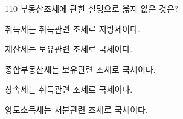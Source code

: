 \begin{question}{110}
부동산조세에 관한 설명으로 옳지 않은 것은?
\begin{choices}
  \item 취득세는 취득관련 조세로 지방세이다.
  \item 재산세는 보유관련 조세로 국세이다.
  \item 종합부동산세는 보유관련 조세로 국세이다.
  \item 상속세는 취득관련 조세로 국세이다.
  \item 양도소득세는 처분관련 조세로 국세이다.
\end{choices}
\end{question}
